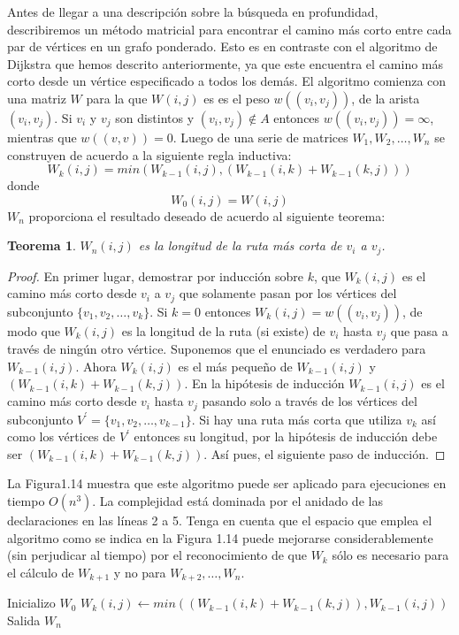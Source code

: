 \documentclass[10pt,a5paper]{book}
\newtheorem{teorema}{Teorema}[chapter]
\begin{document}
Antes de llegar a una descripción sobre la búsqueda en profundidad, describiremos un método matricial para encontrar el camino más corto entre cada par de vértices en un grafo ponderado. Esto es en contraste con el algoritmo de Dijkstra que hemos descrito anteriormente, ya que este encuentra el camino más corto desde un vértice especificado a todos los demás. El algoritmo comienza con una matriz $W$ para la que $W(i,j)$ es es el peso $w((v_i,v_j))$, de la arista $(v_i,v_j)$. Si $v_i$ y $v_j$ son distintos y $(v_i,v_j) \notin A$ entonces $w((v_i,v_j)) = \infty $, mientras que $w((v,v)) = 0$. Luego de una serie de matrices $W_1, W_2, \ldots, W_n$ se construyen de acuerdo a la siguiente regla inductiva:
\[ W_k(i,j) = min (W_{k-1}(i,j), (W_{k-1}(i,k) + W_{k-1}(k,j))) \]
donde
\[ W_0(i,j) = W(i,j) \]
$W_n$ proporciona el resultado deseado de acuerdo al siguiente teorema:
\begin{teorema}
$W_n(i,j)$ es la longitud de la ruta más corta de $v_i$ a $v_j$.
\end{teorema}
\begin{proof}
En primer lugar, demostrar por inducción sobre $k$, que $W_k(i,j)$ es el camino más corto desde $v_i$ a $v_j$ que solamente pasan por los vértices del subconjunto $\{v_1, v_2, \ldots, v_k\}$. Si $k = 0$ entonces $W_k(i,j) = w((v_i,v_j))$, de modo que $W_k(i,j)$ es la longitud de la ruta (si existe) de $v_i$ hasta $v_j$ que pasa a través de ningún otro vértice. Suponemos que el enunciado es verdadero para $W_{k-1}(i,j)$. Ahora $W_k(i,j)$ es el más pequeño de $W_{k-1}(i,j)$ y $(W_{k-1}(i,k) + W_{k-1}(k,j))$. En la hipótesis de inducción $W_{k-1}(i,j)$ es el camino más corto desde $v_i$ hasta $v_j$ pasando solo a través de los vértices del subconjunto $V^{'} = \{v_1, v_2, \ldots, v_{k-1}\}$. Si hay una ruta más corta que utiliza $v_k$ así como los vértices de $V^{'}$ entonces su longitud, por la hipótesis de inducción debe ser $(W_{k-1}(i,k) + W_{k-1}(k,j))$. Así pues, el siguiente paso de inducción.\end{proof}

La Figura1.14 muestra que este algoritmo puede ser aplicado para ejecuciones en tiempo $O(n^3)$. La complejidad está dominada por el anidado de las declaraciones en las líneas 2 a 5. Tenga en cuenta que el espacio que emplea el algoritmo como se indica en la Figura 1.14 puede mejorarse considerablemente (sin perjudicar al tiempo) por el reconocimiento de que $W_k$ sólo es necesario para el cálculo de $W_{k+1}$ y no para $W_{k+2}, \ldots, W_n$.\\
\begin{algorithm}[H]
\caption{ }
\BlankLine
\dontprintsemicolon
Inicializo $W_0$\;
{
  {
    {
      $W_k(i,j)\leftarrow min((W_{k-1}(i,k) + W_{k-1}(k,j)), W_{k-1}(i,j))$\;
    }
  }
}
Salida $W_n$\;
\end{algorithm}
\end{document}
